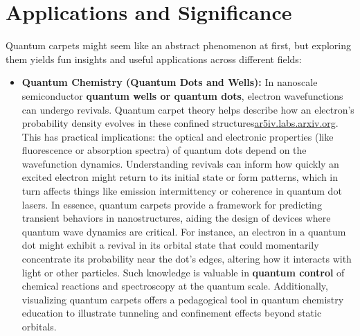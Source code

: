 \documentclass[11pt,a4paper]{article}
\begin{document}
\section{Applications and Significance}

Quantum carpets might seem like an abstract phenomenon at first, but exploring them yields fun insights and useful applications across different fields:

\begin{itemize}
  \item \textbf{Quantum Chemistry (Quantum Dots and Wells):} In nanoscale semiconductor \textbf{quantum wells or quantum dots}, electron wavefunctions can undergo revivals. Quantum carpet theory helps describe how an electron’s probability density evolves in these confined structures\href{https://ar5iv.labs.arxiv.org/html/1808.09708#:~:text=illustrating various fundamental concepts in,Moreover%2C the}{ar5iv.labs.arxiv.org}. This has practical implications: the optical and electronic properties (like fluorescence or absorption spectra) of quantum dots depend on the wavefunction dynamics. Understanding revivals can inform how quickly an excited electron might return to its initial state or form patterns, which in turn affects things like emission intermittency or coherence in quantum dot lasers. In essence, quantum carpets provide a framework for predicting transient behaviors in nanostructures, aiding the design of devices where quantum wave dynamics are critical. For instance, an electron in a quantum dot might exhibit a revival in its orbital state that could momentarily concentrate its probability near the dot’s edges, altering how it interacts with light or other particles. Such knowledge is valuable in \textbf{quantum control} of chemical reactions and spectroscopy at the quantum scale. Additionally, visualizing quantum carpets offers a pedagogical tool in quantum chemistry education to illustrate tunneling and confinement effects beyond static orbitals.

\end{itemize}
\end{document}
